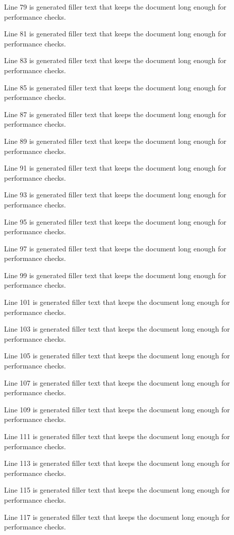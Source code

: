 Line 79 is generated filler text that keeps the document long enough for performance checks.

Line 81 is generated filler text that keeps the document long enough for performance checks.

Line 83 is generated filler text that keeps the document long enough for performance checks.

Line 85 is generated filler text that keeps the document long enough for performance checks.

Line 87 is generated filler text that keeps the document long enough for performance checks.

Line 89 is generated filler text that keeps the document long enough for performance checks.

Line 91 is generated filler text that keeps the document long enough for performance checks.

Line 93 is generated filler text that keeps the document long enough for performance checks.

Line 95 is generated filler text that keeps the document long enough for performance checks.

Line 97 is generated filler text that keeps the document long enough for performance checks.

Line 99 is generated filler text that keeps the document long enough for performance checks.

Line 101 is generated filler text that keeps the document long enough for performance checks.

Line 103 is generated filler text that keeps the document long enough for performance checks.

Line 105 is generated filler text that keeps the document long enough for performance checks.

Line 107 is generated filler text that keeps the document long enough for performance checks.

Line 109 is generated filler text that keeps the document long enough for performance checks.

Line 111 is generated filler text that keeps the document long enough for performance checks.

Line 113 is generated filler text that keeps the document long enough for performance checks.

Line 115 is generated filler text that keeps the document long enough for performance checks.

Line 117 is generated filler text that keeps the document long enough for performance checks.

